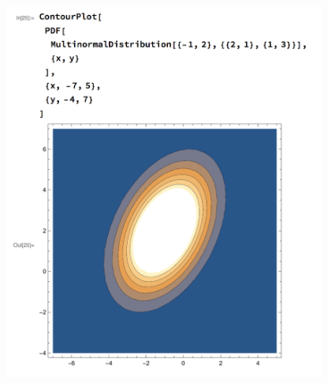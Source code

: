 \begin{enumerate}[label=(\alph*)]
    \begin{mdframed}
      \includegraphics[width=300pt]{img/hw03_2b.png}
    \end{mdframed}


\end{enumerate}

